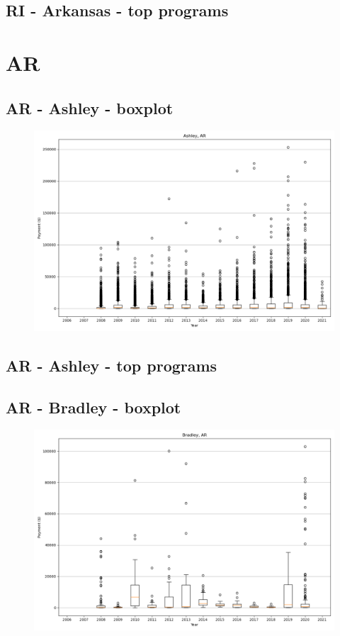 \subsection*{RI - Arkansas - top programs}

\newpage
\section*{AR}
\subsection*{AR - Ashley - boxplot}
\begin{figure}[h]
\centering
\includegraphics[width=7in]{../output/boxplots/counties/Ashley-AR_boxplot.png}
\end{figure}


\subsection*{AR - Ashley - top programs}

\newpage
\subsection*{AR - Bradley - boxplot}
\begin{figure}[h]
\centering
\includegraphics[width=7in]{../output/boxplots/counties/Bradley-AR_boxplot.png}
\end{figure}


